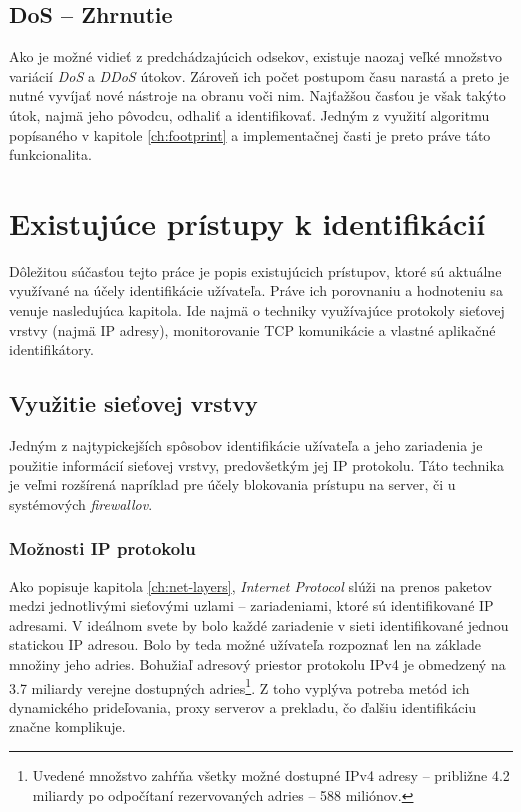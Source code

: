 \documentclass[
  printed, %
  table,   %
  lof,     %
  nolot,   %
  nocover
]{fithesis3}
\begin{document}
\section{DoS -- Zhrnutie}
Ako je možné vidieť z predchádzajúcich odsekov, existuje naozaj veľké množstvo
variácií \textit{DoS} a \textit{DDoS} útokov. Zároveň ich počet postupom času
narastá a preto je nutné vyvíjať nové nástroje na obranu voči nim. Najťažšou časťou
je však takýto útok, najmä jeho pôvodcu, odhaliť a identifikovať. Jedným z využití
algoritmu popísaného v kapitole \ref{ch:footprint} a implementačnej časti je preto
práve táto funkcionalita.

\chapter{Existujúce prístupy k identifikácií}
\label{ch:existing}
Dôležitou súčasťou tejto práce je popis existujúcich prístupov, ktoré
sú aktuálne využívané na účely identifikácie užívateľa. Práve ich porovnaniu
a hodnoteniu sa venuje nasledujúca kapitola.
Ide najmä o techniky využívajúce protokoly sieťovej vrstvy (najmä IP adresy),
monitorovanie TCP komunikácie a vlastné aplikačné identifikátory.

\section{Využitie sieťovej vrstvy}
Jedným z najtypickejších spôsobov identifikácie užívateľa a jeho zariadenia je
použitie informácií sieťovej vrstvy, predovšetkým jej IP protokolu.
Táto technika je veľmi rozšírená napríklad pre účely blokovania prístupu na
server, či u systémových \textit{firewallov}.

\subsection{Možnosti IP protokolu }
Ako popisuje kapitola \ref{ch:net-layers}, \textit{Internet Protocol} slúži na
prenos paketov medzi jednotlivými sieťovými uzlami -- zariadeniami, ktoré sú
identifikované IP adresami. V ideálnom svete by bolo každé zariadenie v sieti
identifikované jednou statickou IP adresou. Bolo by teda možné užívateľa
rozpoznať len na základe množiny jeho adries. Bohužiaľ adresový priestor
protokolu IPv4 je obmedzený na 3.7 miliardy verejne dostupných adries\footnote{
  Uvedené množstvo zahŕňa všetky možné dostupné IPv4 adresy -- približne 4.2
  miliardy po odpočítaní rezervovaných adries -- 588 miliónov.
}.
Z toho vyplýva potreba metód ich dynamického prideľovania, proxy serverov a
prekladu, čo ďalšiu identifikáciu značne komplikuje.
\end{document}
